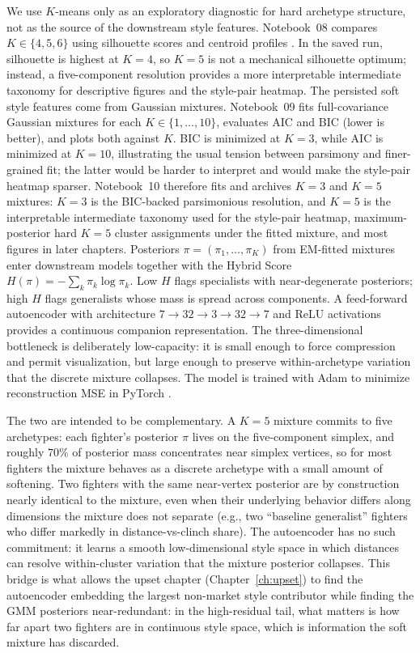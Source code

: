 \documentclass[12pt,oneside]{report}
\begin{document}
We use $K$-means only as an exploratory diagnostic for hard archetype structure, not as the source of the downstream style features.  Notebook~08 compares $K \in \{4,5,6\}$ using silhouette scores and centroid profiles \citep{rousseeuw1987silhouettes}.  In the saved run, silhouette is highest at \(K = 4\), so \(K = 5\) is not a mechanical silhouette optimum; instead, a five-component resolution provides a more interpretable intermediate taxonomy for descriptive figures and the style-pair heatmap.  The persisted soft style features come from Gaussian mixtures.  Notebook~09 fits full-covariance Gaussian mixtures for each $K \in \{1,\ldots,10\}$, evaluates AIC and BIC \citep{akaike1974aic,schwarz1978bic,hastie2009elements} (lower is better), and plots both against $K$.  BIC is minimized at \(K = 3\), while AIC is minimized at \(K = 10\), illustrating the usual tension between parsimony and finer-grained fit; the latter would be harder to interpret and would make the style-pair heatmap sparser.  Notebook~10 therefore fits and archives \(K = 3\) and \(K = 5\) mixtures: \(K = 3\) is the BIC-backed parsimonious resolution, and \(K = 5\) is the interpretable intermediate taxonomy used for the style-pair heatmap, maximum-posterior hard \(K = 5\) cluster assignments under the fitted mixture, and most figures in later chapters.  Posteriors \(\pi = (\pi_1,\ldots,\pi_K)\)
from EM-fitted mixtures \citep{dempster1977em} enter downstream
models together with the Hybrid Score
\(H(\pi) = -\sum_k \pi_k \log \pi_k\).  Low \(H\) flags specialists with
near-degenerate posteriors; high \(H\) flags generalists whose mass is
spread across components.  A feed-forward autoencoder with architecture $7 \to 32 \to 3 \to 32 \to 7$ and ReLU activations provides a continuous companion representation.  The three-dimensional bottleneck is deliberately low-capacity: it is small enough to force compression and permit visualization, but large enough to preserve within-archetype variation that the discrete mixture collapses.  The model is trained with Adam \citep{kingma2014adam} to minimize reconstruction MSE in PyTorch \citep{paszke2019pytorch}.

The two are intended to be complementary.  A \(K = 5\) mixture commits
to five archetypes: each fighter's posterior \(\pi\) lives on the
five-component simplex, and roughly $70\%$ of posterior mass
concentrates near simplex vertices, so for most fighters the
mixture behaves as a discrete archetype with a small amount of
softening.  Two fighters with the same
near-vertex posterior are by construction nearly identical to the
mixture, even when their underlying behavior differs along
dimensions the mixture does not separate (e.g., two ``baseline
generalist'' fighters who differ markedly in distance-vs-clinch
share).  The autoencoder has no such commitment: it learns a smooth low-dimensional style space in which distances can resolve within-cluster variation that the mixture posterior collapses.  This bridge is what allows the upset
chapter (Chapter~\ref{ch:upset}) to find the autoencoder embedding
the largest non-market style contributor while finding the GMM
posteriors near-redundant: in the high-residual tail, what matters is
how far apart two fighters are in continuous style space, which is
information the soft mixture has discarded.
\end{document}
